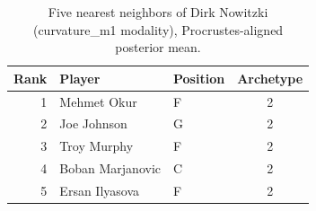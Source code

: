 \begin{table}[htbp]
  \centering\small
  \begin{tabular}{rllc}
    \toprule
    Rank & Player & Position & Archetype \\
    \midrule
    1 & Mehmet Okur & F & 2 \\
    2 & Joe Johnson & G & 2 \\
    3 & Troy Murphy & F & 2 \\
    4 & Boban Marjanovic & C & 2 \\
    5 & Ersan Ilyasova & F & 2 \\
    \bottomrule
  \end{tabular}
  \caption{Five nearest neighbors of Dirk Nowitzki (curvature_m1 modality), Procrustes-aligned posterior mean.}
  \label{tab:Dirk_Nowitzki_neighbors_curvature_m1}
\end{table}

